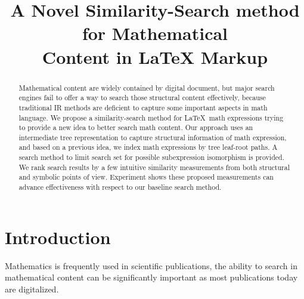 \documentclass{acm_proc_article-sp}
\begin{document}
\title{A Novel Similarity-Search method for Mathematical \\ Content in {\ttlit LaTeX} Markup}


\maketitle
\begin{abstract}
Mathematical content are widely contained by digital document, but major search engines fail to offer a way to search those structural content effectively, because traditional IR methods are deficient to capture some important aspects in math language. 
We propose a similarity-search method for \LaTeX\ math expressions trying to provide a new idea to better search math content.
Our approach uses an intermediate tree representation to capture structural information of math expression, and based on a previous idea, we index math expressions by tree leaf-root paths. 
A search method to limit search set for possible subexpression isomorphism is provided.
We rank search results by a few intuitive similarity measurements from both structural and symbolic points of view. 
Experiment shows these proposed measurements can advance effectiveness with respect to our baseline search method.
\end{abstract}



\section{Introduction}
\label{intro}
Mathematics is frequently used in scientific publications, 
the ability to search in mathematical content can be significantly important as most publications today are digitalized.
\end{document}
